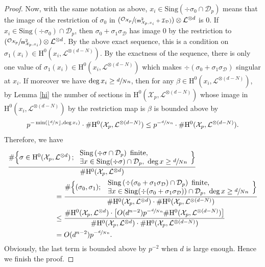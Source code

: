 \documentclass[JEP,XML,SOM,Unicode,published]{cedram}
\newcommand{\Psfrac}[2]{(\sfrac{#1}{#2})}
\newcommand{\Pspfrac}[2]{(\sfrac{#1}{(#2)})}
\newcommand{\sep}{\,;\,}
\theoremstyle{plain}
\theoremstyle{definition}
\newcommand{\ho}{\mathrm{H}}
\newcommand{\X}{\mathcal{X}}
\newcommand{\li}{\mathcal{L}}
\begin{document}
\begin{proof}
Now, with the same notation as above, $x_i\in \mathrm{Sing}(\div \sigma_0\cap \mathcal{D}_p)$ means that the image of the restriction of $\sigma_0$ in $\Pspfrac{\mathcal{O}_{\X_p}}{\mathfrak{m}^2_{\X_p, x_i}+\mathcal{I}_{\mathcal{D}}}\otimes \li^{\otimes d}$ is $0$. If \hbox{$x_i\in \mathrm{Sing}(\div \sigma_0)\cap \mathcal{D}_p$}, then $\sigma_0+\sigma_1\sigma_{\mathcal{D}}$ has image 0 by the restriction to $\Psfrac{\mathcal{O}_{\X_p}}{\mathfrak{m}_{\X_p, x_i}^2}\otimes \li^{\otimes d}$. By the above exact sequence, this is a condition on $\sigma_1(x_i)\in\ho^0(x_i, \li^{\otimes (d-N)})$. By the exactness of the sequence, there is only one value of $\sigma_1(x_i)\in \ho^0(x_i, \li^{\otimes (d-N)})$ which makes $\div (\sigma_0+\sigma_1\sigma_{\mathcal{D}})$ singular at $x_i$. If moreover we have $\deg x_i \geq\sfrac{d}{Nn}$, then for any $\beta\in \ho^0(x_i, \li^{\otimes (d-N)})$, by Lemma \ref{hi} the number of sections in $\ho^0(\X_p, \li^{\otimes (d-N)})$ whose image in $\ho^0(x_i, \li^{\otimes (d-N)})$ by the restriction map is $\beta$ is bounded above by\vspace*{-3pt}
\[
p^{{-\min(\lfloor\sfrac{d}{N}\rfloor, \deg x_i)}}\cdot \#\ho^0(\X_p, \li^{\otimes (d-N)})\leq p^{-\sfrac{d}{Nn}}\cdot \#\ho^0(\X_p, \li^{\otimes (d-N)}).
\]
Therefore, we have\vspace*{-3pt}
\begin{align*}
\frac{\#\Bigl\{ \sigma\in \ho^0(\X_p, \li^{\otimes d})\sep \begin{array}{ll}
\mathrm{Sing}\left(\div \sigma \cap \mathcal{D}_p\right) \text{ finite,}\\ \exists x\in\mathrm{Sing}(\div \sigma)\cap \mathcal{D}_p,\ \deg x\geq \sfrac{d}{Nn}
\end{array} \Bigr\}}{\#\ho^0(\X_p, \li^{\otimes d})}&\\
&\hspace*{-7cm}=\frac{\#\Bigl\{ (\sigma_0,\sigma_1);\
\begin{array}{ll}
\mathrm{Sing}\left(\div (\sigma_0+\sigma_1\sigma_{\mathcal{D}})\cap \mathcal{D}_p\right) \text{ finite,}\\ \exists x\in\mathrm{Sing}(\div (\sigma_0+\sigma_1\sigma_{\mathcal{D}}))\cap \mathcal{D}_p,\ \deg x\geq \sfrac{d}{Nn}
\end{array}
\Bigr\}}{\#\ho^0(\X_p, \li^{\otimes d})\cdot \#\ho^0(\X_p, \li^{\otimes (d-N)})}\\
&\hspace*{-7cm}\leq \frac{\#\ho^0(\X_p, \li^{\otimes d})\cdot \left[O(d^{n-2}) p^{-\sfrac{d}{Nn}}\#\ho^0(\X_p, \li^{\otimes (d-N)})\right]}{\#\ho^0(\X_p, \li^{\otimes d})\cdot \#\ho^0(\X_p, \li^{\otimes (d-N)})}\\
&\hspace*{-7cm}=O(d^{n-2}) p^{-\sfrac{d}{Nn}}.
\end{align*}
Obviously, the last term is bounded above by $p^{-2}$ when $d$ is large enough. Hence we finish the proof.
\end{proof}
\end{document}
